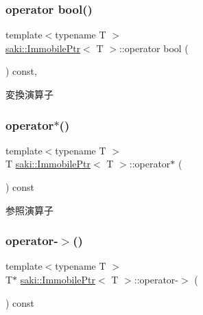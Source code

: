 \subsubsection{\texorpdfstring{operator bool()}{operator bool()}}
{\footnotesize\ttfamily template$<$typename T $>$ \\
\mbox{\hyperlink{classsaki_1_1_immobile_ptr}{saki\+::\+Immobile\+Ptr}}$<$ T $>$\+::operator bool (\begin{DoxyParamCaption}{ }\end{DoxyParamCaption}) const\hspace{0.3cm}{\ttfamily [inline]}, {\ttfamily [explicit]}}



変換演算子 

\mbox{\label{classsaki_1_1_immobile_ptr_acda7da57ed5dd06c866bd7c96d254cc1}} 
\subsubsection{\texorpdfstring{operator$\ast$()}{operator*()}}
{\footnotesize\ttfamily template$<$typename T $>$ \\
T \mbox{\hyperlink{classsaki_1_1_immobile_ptr}{saki\+::\+Immobile\+Ptr}}$<$ T $>$\+::operator$\ast$ (\begin{DoxyParamCaption}{ }\end{DoxyParamCaption}) const\hspace{0.3cm}{\ttfamily [inline]}}



参照演算子 

\mbox{\label{classsaki_1_1_immobile_ptr_a54b22ca7f98168cf42f3b66f3da26006}} 
\subsubsection{\texorpdfstring{operator-\/$>$()}{operator->()}}
{\footnotesize\ttfamily template$<$typename T $>$ \\
T$\ast$ \mbox{\hyperlink{classsaki_1_1_immobile_ptr}{saki\+::\+Immobile\+Ptr}}$<$ T $>$\+::operator-\/$>$ (\begin{DoxyParamCaption}{ }\end{DoxyParamCaption}) const\hspace{0.3cm}{\ttfamily [inline]}}



